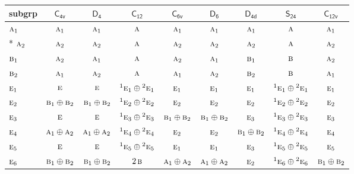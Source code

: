 \documentclass[10pt,a4paper]{article}
\numberwithin{equation}{section}
\newcommand{\grp}[1]{\mathsf{#1}}
\newcommand{\irr}[1]{\text{\normalfont\scshape #1}}
\newcommand{\conjpair}[1]{{}^{#1}}
\begin{document}
{\small\begin{longtable}{@{}lcccccccc@{}}\toprule
subgrp & \href{C4v.pdf}{$\grp{C_{4v}}$} & \href{D4.pdf}{$\grp{D_{4}}$} & \href{C12.pdf}{$\grp{C_{12}}$} & \href{C6v.pdf}{$\grp{C_{6v}}$} & \href{D6.pdf}{$\grp{D_{6}}$} & \href{D4d.pdf}{$\grp{D_{4d}}$} & \href{S24.pdf}{$\grp{S_{24}}$} & \href{C12v.pdf}{$\grp{C_{12v}}$}\\\midrule\endhead
\bottomrule\endfoot\endlastfoot
$\irr{a}_{1}$ & $\irr{a}_{1}$ & $\irr{a}_{1}$ & $\irr{a}$ & $\irr{a}_{1}$ & $\irr{a}_{1}$ & $\irr{a}_{1}$ & $\irr{a}$ & $\irr{a}_{1}$\\*
$\irr{a}_{2}$ & $\irr{a}_{2}$ & $\irr{a}_{2}$ & $\irr{a}$ & $\irr{a}_{2}$ & $\irr{a}_{2}$ & $\irr{a}_{2}$ & $\irr{a}$ & $\irr{a}_{2}$\\
$\irr{b}_{1}$ & $\irr{a}_{2}$ & $\irr{a}_{1}$ & $\irr{a}$ & $\irr{a}_{2}$ & $\irr{a}_{1}$ & $\irr{b}_{1}$ & $\irr{b}$ & $\irr{a}_{2}$\\
$\irr{b}_{2}$ & $\irr{a}_{1}$ & $\irr{a}_{2}$ & $\irr{a}$ & $\irr{a}_{1}$ & $\irr{a}_{2}$ & $\irr{b}_{2}$ & $\irr{b}$ & $\irr{a}_{1}$\\
$\irr{e}_{1}$ & $\irr{e}$ & $\irr{e}$ & $\conjpair{1}\irr{e}_{1}\oplus \conjpair{2}\irr{e}_{1}$ & $\irr{e}_{1}$ & $\irr{e}_{1}$ & $\irr{e}_{1}$ & $\conjpair{1}\irr{e}_{1}\oplus \conjpair{2}\irr{e}_{1}$ & $\irr{e}_{1}$\\
$\irr{e}_{2}$ & $\irr{b}_{1}\oplus \irr{b}_{2}$ & $\irr{b}_{1}\oplus \irr{b}_{2}$ & $\conjpair{1}\irr{e}_{2}\oplus \conjpair{2}\irr{e}_{2}$ & $\irr{e}_{2}$ & $\irr{e}_{2}$ & $\irr{e}_{2}$ & $\conjpair{1}\irr{e}_{2}\oplus \conjpair{2}\irr{e}_{2}$ & $\irr{e}_{2}$\\
$\irr{e}_{3}$ & $\irr{e}$ & $\irr{e}$ & $\conjpair{1}\irr{e}_{3}\oplus \conjpair{2}\irr{e}_{3}$ & $\irr{b}_{1}\oplus \irr{b}_{2}$ & $\irr{b}_{1}\oplus \irr{b}_{2}$ & $\irr{e}_{3}$ & $\conjpair{1}\irr{e}_{3}\oplus \conjpair{2}\irr{e}_{3}$ & $\irr{e}_{3}$\\
$\irr{e}_{4}$ & $\irr{a}_{1}\oplus \irr{a}_{2}$ & $\irr{a}_{1}\oplus \irr{a}_{2}$ & $\conjpair{1}\irr{e}_{4}\oplus \conjpair{2}\irr{e}_{4}$ & $\irr{e}_{2}$ & $\irr{e}_{2}$ & $\irr{b}_{1}\oplus \irr{b}_{2}$ & $\conjpair{1}\irr{e}_{4}\oplus \conjpair{2}\irr{e}_{4}$ & $\irr{e}_{4}$\\
$\irr{e}_{5}$ & $\irr{e}$ & $\irr{e}$ & $\conjpair{1}\irr{e}_{5}\oplus \conjpair{2}\irr{e}_{5}$ & $\irr{e}_{1}$ & $\irr{e}_{1}$ & $\irr{e}_{3}$ & $\conjpair{1}\irr{e}_{5}\oplus \conjpair{2}\irr{e}_{5}$ & $\irr{e}_{5}$\\
$\irr{e}_{6}$ & $\irr{b}_{1}\oplus \irr{b}_{2}$ & $\irr{b}_{1}\oplus \irr{b}_{2}$ & $2\,\irr{b}$ & $\irr{a}_{1}\oplus \irr{a}_{2}$ & $\irr{a}_{1}\oplus \irr{a}_{2}$ & $\irr{e}_{2}$ & $\conjpair{1}\irr{e}_{6}\oplus \conjpair{2}\irr{e}_{6}$ & $\irr{b}_{1}\oplus \irr{b}_{2}$\\

\end{longtable}}
\end{document}
